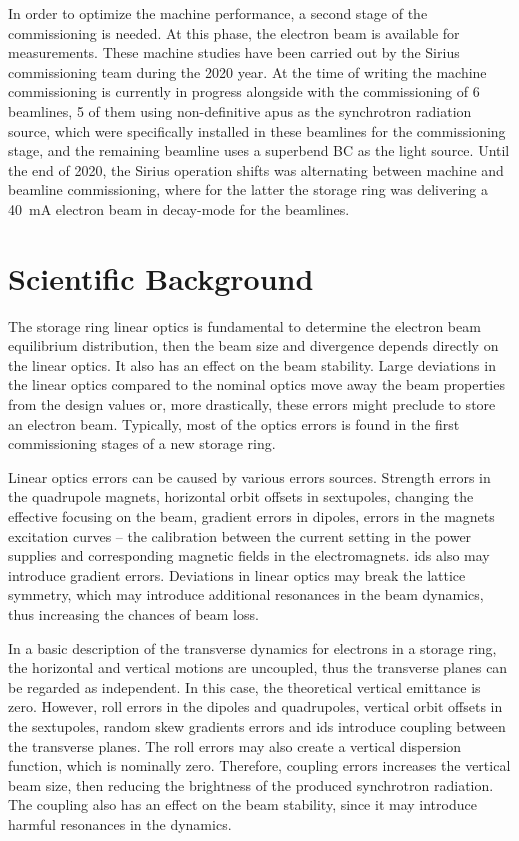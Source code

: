 In order to optimize the machine performance, a second stage of the commissioning is needed. At this phase, the electron beam is available for measurements. These machine studies have been carried out by the Sirius commissioning team during the 2020 year. At the time of writing the machine commissioning is currently in progress alongside with the commissioning of 6 beamlines, 5 of them using non-definitive \glspl{apu} as the synchrotron radiation source, which were specifically installed in these beamlines for the commissioning stage, and the remaining beamline uses a superbend BC as the light source. Until the end of 2020, the Sirius operation shifts was alternating between machine and beamline commissioning, where for the latter the storage ring was delivering a \SI{40}{\milli\ampere} electron beam in decay-mode for the beamlines.
\section{Scientific Background}\label{sec:background}
The storage ring linear optics is fundamental to determine the electron beam equilibrium distribution, then the beam size and divergence depends directly on the linear optics. It also has an effect on the beam stability. Large deviations in the linear optics compared to the nominal optics move away the beam properties from the design values or, more drastically, these errors might preclude to store an electron beam. Typically, most of the optics errors is found in the first commissioning stages of a new storage ring.

Linear optics errors can be caused by various errors sources. Strength errors in the quadrupole magnets, horizontal orbit offsets in sextupoles, changing the effective focusing on the beam, gradient errors in dipoles, errors in the magnets excitation curves -- the calibration between the current setting in the power supplies and corresponding magnetic fields in the electromagnets. \glspl{id} also may introduce gradient errors. Deviations in linear optics may break the lattice symmetry, which may introduce additional resonances in the beam dynamics, thus increasing the chances of beam loss.

In a basic description of the transverse dynamics for electrons in a storage ring, the horizontal and vertical motions are uncoupled, thus the transverse planes can be regarded as independent. In this case, the theoretical vertical emittance is zero. However, roll errors in the dipoles and quadrupoles, vertical orbit offsets in the sextupoles, random skew gradients errors and \glspl{id} introduce coupling between the transverse planes. The roll errors may also create a vertical dispersion function, which is nominally zero. Therefore, coupling errors increases the vertical beam size, then reducing the brightness of the produced synchrotron radiation. The coupling also has an effect on the beam stability, since it may introduce harmful resonances in the dynamics.

